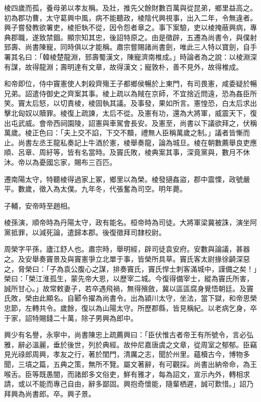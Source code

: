 \begin{pinyinscope}
棱四歲而孤，養母弟以孝友稱。及壯，推先父餘財數百萬與從昆弟，鄉里益高之。初為郡功曹，太守葛興中風，病不能聽政，棱陰代興視事，出入二年，令無違者。興子嘗發教欲署吏，棱拒執不從，因令怨者章之。事下案驗，吏以棱掩蔽興病，專典郡職，遂致禁錮。顯宗知其忠，後詔特原之。由是徵辟，五遷為尚書令，與僕射郅壽、尚書陳寵，同時俱以才能稱。肅宗嘗賜諸尚書劍，唯此三人特以寶劍，自手署其名曰：「韓棱楚龍淵，郅壽蜀漢文，陳寵濟南椎成。」時論者為之說：以棱淵深有謀，故得龍淵；壽明達有文章，故得漢文；寵敦朴，善不見外，故得椎成。

和帝即位，侍中竇憲使人刺殺齊殤王子都鄉侯暢於上東門，有司畏憲，咸委疑於暢兄弟。詔遣侍御史之齊案其事。棱上疏以為賊在京師，不宜捨近問遠，恐為姦臣所笑。竇太后怒，以切責棱，棱固執其議。及事發，果如所言。憲惶恐，白太后求出擊北匈奴以贖罪。棱復上疏諫，太后不從。及憲有功，還為大將軍，威震天下，復出屯武威。會帝西祠園陵，詔憲與車駕會長安。及憲至，尚書以下議欲拜之，伏稱萬歲。棱正色曰：「夫上交不諂，下交不黷，禮無人臣稱萬歲之制。」議者皆慚而止。尚書左丞王龍私奏記上牛酒於憲，棱舉奏龍，論為城旦。棱在朝數薦舉良吏應順、呂章、周紆等，皆有名當時。及竇氏敗，棱典案其事，深竟黨與，數月不休沐。帝以為憂國忘家，賜布三百匹。

遷南陽太守，特聽棱得過家上冢，鄉里以為榮。棱發擿姦盜，郡中震慄，政號嚴平。數歲，徵入為太僕。九年冬，代張奮為司空。明年薨。

子輔，安帝時至趙相。

棱孫演，順帝時為丹陽太守，政有能名。桓帝時為司徒。大將軍梁冀被誅，演坐阿黨抵罪，以減死論，遣歸本郡。後復徵拜司隸校尉。

周榮字平孫，廬江舒人也。肅宗時，舉明經，辟司徒袁安府。安數與論議，甚器之。及安舉奏竇景及與竇憲爭立北單于事，皆榮所具草。竇氏客太尉掾徐齮深惡之，脅榮曰：「子為袁公腹心之謀，排奏竇氏，竇氏悍士刺客滿城中，謹備之矣！」榮曰：「榮江淮孤生，蒙先帝大恩，以歷宰二城。今復得備宰士，縱為竇氏所害，誠所甘心。」故常敕妻子，若卒遇飛禍，無得殯斂，冀以區區腐身覺悟朝廷。及竇氏敗，榮由此顯名。自郾令擢為尚書令。出為潁川太守，坐法，當下獄，和帝思榮忠節，左轉共令。歲餘，復以為山陽太守。所歷郡縣，皆見稱紀。以老病乞身，卒于家，詔特賜錢二十萬，除子男興為郎中。

興少有名譽，永寧中，尚書陳忠上疏薦興曰：「臣伏惟古者帝王有所號令，言必弘雅，辭必溫麗，垂於後世，列於典經。故仲尼嘉唐虞之文章，從周室之郁郁。臣竊見光祿郎周興，孝友之行，著於閨門，清厲之志，聞於州里。蘊櫝古今，博物多聞，三墳之篇，五典之策，無所不覽。屬文著辭，有可觀採。尚書出納帝命，為王喉舌。臣等既愚闇，而諸郎多文俗吏，鮮有雅才，每為詔文，宣示內外，轉相求請，或以不能而專己自由，辭多鄙固。興抱奇懷能，隨輩栖遲，誠可歎惜。」詔乃拜興為尚書郎。卒。興子景。


\end{pinyinscope}
